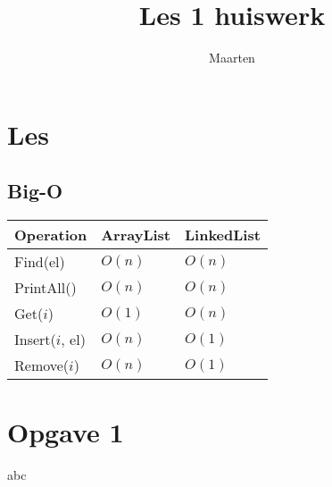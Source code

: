 \documentclass[12pt,a4paper]{article}
\title{Les 1 huiswerk}
\author{Maarten}
\begin{document}
\maketitle
\section{Les}
\subsection{Big-O}

\begin{tabular}{l|l|l}
Operation & ArrayList & LinkedList \\
\hline
Find(el)        & $O(n)$ & $O(n)$ \\
PrintAll()      & $O(n)$ & $O(n)$ \\
Get($i$)        & $O(1)$ & $O(n)$ \\
Insert($i$, el) & $O(n)$ & $O(1)$ \\
Remove($i$)     & $O(n)$ & $O(1)$ \\

\end{tabular}

\section{Opgave 1}
abc
\end{document}
